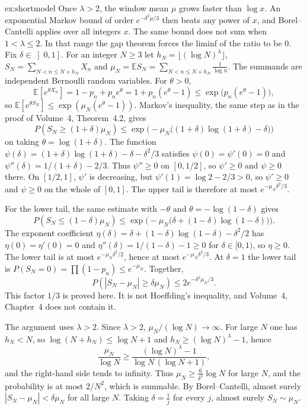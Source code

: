 \begin{solution}{ex:shortmodel}
\idea Once $\lambda>2$, the window mean $\mu$ grows faster than $\log x$. An exponential Markov bound of order $e^{-\delta^2\mu/3}$ then beats any power of $x$, and Borel--Cantelli applies over all integers $x$. The same bound does not sum when $1<\lambda\le 2$. In that range the gap theorem forces the liminf of the ratio to be $0$.
\writeup Fix $\delta\in\left]0,1\right]$. For an integer $N\ge3$ let $h_N=\lfloor(\log N)^\lambda\rfloor$, $S_N=\sum_{N<n\le N+h_N}X_n$ and $\mu_N=\mathbb ES_N=\sum_{N<n\le N+h_N}\frac1{\log n}$. The summands are independent Bernoulli random variables. For $\theta>0$,
\[
\mathbb E[e^{\theta X_n}]=1-p_n+p_ne^{\theta}=1+p_n(e^{\theta}-1)\le\exp\bigl(p_n(e^{\theta}-1)\bigr),
\]
so $\mathbb E[e^{\theta S_N}]\le\exp(\mu_N(e^{\theta}-1))$. Markov's inequality, the same step as in the proof of Volume~4, Theorem~4.2, gives
\[
P(S_N\ge(1+\delta)\mu_N)\le\exp\bigl(-\mu_N\bigl((1+\delta)\log(1+\delta)-\delta\bigr)\bigr)
\]
on taking $\theta=\log(1+\delta)$. The function $\psi(\delta)=(1+\delta)\log(1+\delta)-\delta-\delta^2/3$ satisfies $\psi(0)=\psi'(0)=0$ and $\psi''(\delta)=1/(1+\delta)-2/3$. Thus $\psi''\ge0$ on $[0,1/2]$, so $\psi'\ge0$ and $\psi\ge0$ there. On $[1/2,1]$, $\psi'$ is decreasing, but $\psi'(1)=\log2-2/3>0$, so $\psi'\ge0$ and $\psi\ge0$ on the whole of $[0,1]$. The upper tail is therefore at most $e^{-\mu_N\delta^2/3}$.

For the lower tail, the same estimate with $-\theta$ and $\theta=-\log(1-\delta)$ gives
\[
P(S_N\le(1-\delta)\mu_N)\le\exp\bigl(-\mu_N\bigl(\delta+(1-\delta)\log(1-\delta)\bigr)\bigr).
\]
The exponent coefficient $\eta(\delta)=\delta+(1-\delta)\log(1-\delta)-\delta^2/2$ has $\eta(0)=\eta'(0)=0$ and $\eta''(\delta)=1/(1-\delta)-1\ge0$ for $\delta\in[0,1)$, so $\eta\ge0$. The lower tail is at most $e^{-\mu_N\delta^2/2}$, hence at most $e^{-\mu_N\delta^2/3}$. At $\delta=1$ the lower tail is $P(S_N=0)=\prod(1-p_n)\le e^{-\mu_N}$. Together,
\[
P(|S_N-\mu_N|\ge\delta\mu_N)\le 2e^{-\delta^2\mu_N/3}.
\]
This factor $1/3$ is proved here. It is not Hoeffding's inequality, and Volume~4, Chapter~4 does not contain it.

The argument uses $\lambda>2$. Since $\lambda>2$, $\mu_N/(\log N)\to\infty$. For large $N$ one has $h_N<N$, so $\log(N+h_N)\le\log N+1$ and $h_N\ge(\log N)^\lambda-1$, hence
\[
\frac{\mu_N}{\log N}\ge\frac{(\log N)^\lambda-1}{\log N\,(\log N+1)},
\]
and the right-hand side tends to infinity. Thus $\mu_N\ge\frac{6}{\delta^2}\log N$ for large $N$, and the probability is at most $2/N^2$, which is summable. By Borel--Cantelli, almost surely $|S_N-\mu_N|<\delta\mu_N$ for all large $N$. Taking $\delta=\frac1j$ for every $j$, almost surely $S_N\sim\mu_N$.


\end{solution}
